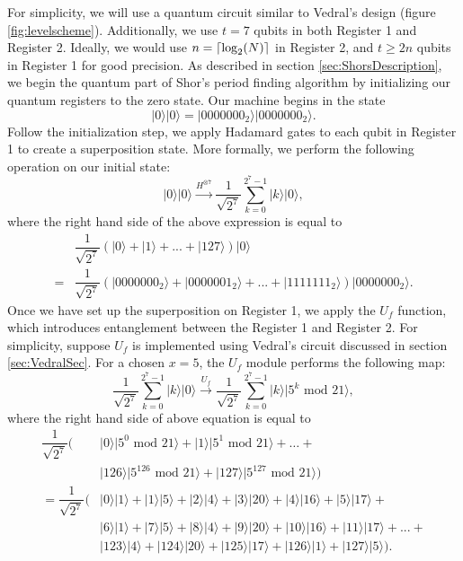 \documentclass{article}
\DeclarePairedDelimiter\ceil{\lceil}{\rceil}
\begin{document}
For simplicity, we will use a quantum circuit similar to Vedral's design (figure \ref{fig:levelscheme}). Additionally, we use $t=7$ qubits in both Register 1 and Register 2. Ideally, we would use $n = \ceil*{\log_2(N)}$ in Register 2, and $t\geq 2n$ qubits in Register 1 for good precision. As described in section \ref{sec:ShorsDescription}, we begin the quantum part of Shor's period finding algorithm by initializing our quantum registers to the zero state. Our machine begins in the state
\begin{equation*}
|0\rangle|0\rangle = |0000000_2\rangle|0000000_2\rangle.
\end{equation*}
Follow the initialization step, we apply Hadamard gates to each qubit in Register 1 to create a superposition state. More formally, we perform the following operation on our initial state:
\begin{equation*}
|0\rangle|0\rangle \xrightarrow{H^{\otimes 7}} \dfrac{1}{\sqrt{2^7}} \sum_{k=0}^{2^7-1}|k\rangle|0\rangle,
\end{equation*}
where the right hand side of the above expression is equal to 
\begin{align*}
& \dfrac{1}{\sqrt{2^7}}\left(|0\rangle + |1\rangle + ... + |127\rangle\right) |0\rangle \\
=&  \dfrac{1}{\sqrt{2^7}} \left(|0000000_2\rangle + |0000001_2\rangle + ... + |1111111_2\rangle \right) |0000000_2\rangle.
\end{align*}
Once we have set up the superposition on Register 1, we apply the $U_f$ function, which introduces entanglement between the Register 1 and Register 2. For simplicity, suppose $U_f$ is implemented using Vedral's circuit discussed in section \ref{sec:VedralSec}. For a chosen $x = 5$, the $U_f$ module performs the following map:
\begin{equation*}
\dfrac{1}{\sqrt{2^7}} \sum_{k=0}^{2^7-1}|k\rangle|0\rangle \xrightarrow{U_f} \dfrac{1}{\sqrt{2^7}} \sum_{k=0}^{2^7-1}|k\rangle|5^k \text{ mod } 21\rangle,
\end{equation*}
where the right hand side of above equation is equal to
\begin{align*}
\dfrac{1}{\sqrt{2^7}} (&|0\rangle |5^0 \text{ mod } 21\rangle + |1\rangle |5^1 \text{ mod } 21\rangle + \ldots +\\
&|126\rangle |5^{126} \text{ mod } 21\rangle + |127\rangle|5^{127} \text{ mod } 21\rangle) \\
= \dfrac{1}{\sqrt{2^7}} (&|0\rangle |1\rangle + |1\rangle |5\rangle + |2\rangle |4\rangle + |3\rangle |20\rangle + |4\rangle |16\rangle + |5\rangle|17\rangle + \\
& |6\rangle |1\rangle + |7\rangle|5\rangle + |8\rangle |4\rangle  + |9\rangle |20\rangle + |10\rangle |16\rangle + |11\rangle |17\rangle + ... +\\
& |123\rangle|4\rangle + |124\rangle|20\rangle + |125\rangle|17\rangle + |126\rangle|1\rangle + |127\rangle|5\rangle).
\end{align*}
\end{document}
